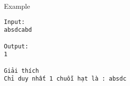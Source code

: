 Example
\begin{verbatim}
Input:
absdcabd

Output:
1

Giải thích
Chỉ duy nhất 1 chuỗi hạt là : absdc

\end{verbatim}